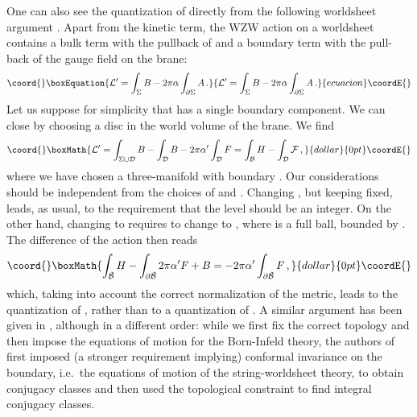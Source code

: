\documentclass[a4paper,12pt]{article} \usepackage{amssymb,amsfonts,latexsym}
\begin{document}
One can also see the quantization of \coordHE{} directly from the following 
worldsheet argument \cite{pelc}. Apart from the kinetic term, the WZW action 
on a worldsheet \myHighlight{$\Sigma$}\coordHE{} contains a bulk term with the pullback of \coordHE{}
and a boundary term with the pull-back of the gauge field \coordHE{} on the brane:
\begin{equation}\coord{}\boxEquation{
\call' = \int_\Sigma B - 2\pi \alpha \int_{\partial\Sigma} A \, . 
\label{action} }{
\call' = \int_\Sigma B - 2\pi \alpha \int_{\partial\Sigma} A \, . 
}{ecuacion}\coordE{}\end{equation}
Let us suppose for simplicity that \myHighlight{$\Sigma$}\coordHE{} has a single boundary component.
We can close \myHighlight{$\Sigma$}\coordHE{} by choosing a disc \myHighlight{$\cald$}\coordHE{} in the world volume of
the brane. We find
$$\coord{}\boxMath{ 
\call' = \int_{\Sigma\cup \cald} B - \int_{\cald} B - 2\pi\alpha' 
\int_\cald F 
= \int_{\calb} H - \int_\cald \calf  \, , }{dollar}{0pt}\coordE{}$$
where we have chosen a three-manifold \myHighlight{$\calb$}\coordHE{} with boundary \myHighlight{$\Sigma\cup \cald$}\coordHE{}.
Our considerations should be independent from the choices of \myHighlight{$\cald$}\coordHE{} and
\myHighlight{$\calb$}\coordHE{}. Changing \myHighlight{$\calb$}\coordHE{}, but keeping \myHighlight{$\cald$}\coordHE{} fixed, leads, as usual, to
the requirement that the level \coordHE{} should be an integer. On the other hand,
changing \myHighlight{$\cald$}\coordHE{} to \coordHE{} requires to change \myHighlight{$\calb$}\coordHE{} to \coordHE{}, where \myHighlight{$\tilde\calb$}\coordHE{} is a full ball, bounded by
\coordHE{}. The difference of the action  then reads
$$\coord{}\boxMath{ 
\int_{\tilde\calb} H - \int_{\partial\tilde\calb} 2\pi\alpha' F + B 
= - 2\pi\alpha' \int_{\partial\tilde\calb} F \,, }{dollar}{0pt}\coordE{}$$
which, taking into account the correct normalization of the metric, leads
to the quantization of \coordHE{}, rather than to a quantization of \myHighlight{$\calf$}\coordHE{}. 
A similar argument has been given in \cite{alsc2}, although in a 
different order: while we first fix the correct topology and then impose
the equations of motion for the Born-Infeld theory, the authors of \cite{alsc2}
first imposed (a stronger requirement implying) conformal invariance 
on the boundary, i.e.\ the equations of motion of the string-worldsheet 
theory, to obtain conjugacy classes and then used the topological constraint to 
find integral conjugacy classes.
\end{document}

